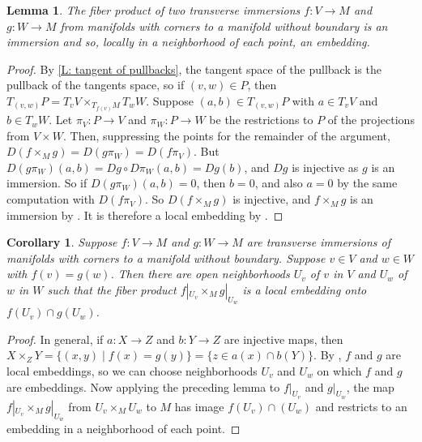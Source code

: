 \documentclass[12pt]{article}
\theoremstyle{plain}
\newtheorem{corollary}[theorem]{Corollary}
\newtheorem{lemma}[theorem]{Lemma}
\theoremstyle{definition}
\theoremstyle{remark}
\begin{document}
\begin{lemma}
	The fiber product of two transverse immersions $f \colon V \to M$ and $g \colon W \to M$ from manifolds with corners to a manifold without boundary is an immersion and so, locally in a neighborhood of each point, an embedding.
\end{lemma}
\begin{proof}
	By \cref{L: tangent of pullbacks}, the tangent space of the pullback is the pullback of the tangents space, so if $(v,w) \in P$, then $T_{(v,w)}P = T_vV \times_{T_{f(v)}M} T_wW$. 
	Suppose $(a,b) \in T_{(v,w)}P$ with $a \in T_vV$ and $b \in T_wW$. 
	Let $\pi_V \colon P \to V$ and $\pi_W \colon P \to W$ be the restrictions to $P$ of the projections from $V \times W$.
	Then, suppressing the points for the remainder of the argument, $D(f \times_M g) = D(g\pi_W) = D(f \pi_V)$.
	But $D(g \pi_W)(a,b)=Dg\circ D\pi_W (a,b)=Dg(b)$, and $Dg$ is injective as $g$ is an immersion. 
	So if $D(g \pi_W)(a,b)=0$, then $b=0$, and also $a=0$ by the same computation with $D(f \pi_V)$.
	So $D(f \times_M g)$ is injective, and $f \times_M g$ is an immersion by \cite[Proposition 3.2.6]{MaDo92}.
	It is therefore a local embedding by \cite[Proposition 3.2.13]{MaDo92}.  
\end{proof}

\begin{corollary}
Suppose $f \colon V \to M$ and $g \colon W \to M$ are transverse immersions of manifolds with corners to a manifold without boundary. Suppose $v \in V$ and $w \in W$ with $f(v) = g(w)$. 
Then there are open neighborhoods $U_v$ of $v$ in $V$ and $U_w$ of $w$ in $W$ such that the fiber product $f|_{U_v} \times_M g|_{U_w}$ is a local embedding onto $f(U_v) \cap g(U_w)$. 
\end{corollary}

\begin{proof}
In general, if $a: X \to Z$ and $b: Y \to Z$ are injective maps, then $X \times_Z Y = \{(x,y) \mid f(x) = g(y)\} = \{ z \in a(x) \cap b(Y) \}$. 
By \cite[Proposition 3.2.13]{MaDo92}, $f$ and $g$ are local embeddings, so we can choose neighborhoods $U_v$ and $U_w$ on which $f$ and $g$ are embeddings. 
Now applying the preceding lemma to $f|_{U_v}$ and $g|_{U_w}$, the map $f|_{U_v} \times_M g|_{U_w}$ from $U_v \times_M U_w$ to $M$ has image $f(U_v) \cap (U_w)$ and restricts to an embedding in a neighborhood of each point. 
\end{proof}




\end{document}
